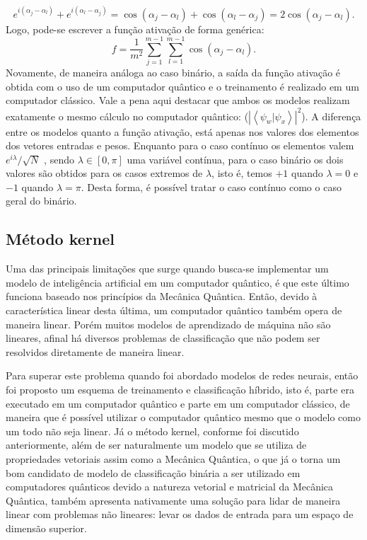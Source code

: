 \begin{equation}
e^{i\left(\alpha_{j}-\alpha_{l}\right)}+e^{i\left(\alpha_{l}-\alpha_{j}\right)}=\cos\left(\alpha_{j}-\alpha_{l}\right)+\cos\left(\alpha_{l}-\alpha_{j}\right)=2\cos\left(\alpha_{j}-\alpha_{l}\right)
. \end{equation}
Logo, pode-se escrever a função ativação de forma genérica:
\begin{equation}
f=\frac{1}{m^{2}}\sum_{j=1}^{m-1}\sum_{l=1}^{m-1}\cos\left(\alpha_{j}-\alpha_{l}\right)
. \end{equation}
Novamente, de maneira análoga ao caso binário, a saída da função ativação é obtida com o uso de um computador quântico e o treinamento é realizado em um computador clássico. Vale a pena aqui destacar que ambos os modelos realizam exatamente o mesmo cálculo no computador quântico: ($\left|\left\langle \psi_{w}|\psi_{x}\right\rangle \right|^{2}$). A diferença entre os modelos quanto a função ativação, está apenas nos valores dos elementos dos vetores entradas e pesos. Enquanto para o caso contínuo os elementos valem $e^{i\lambda}/ \sqrt{N}$ , sendo $\lambda\in\left[0,\pi\right]$ uma variável contínua, para o caso binário os dois valores são obtidos para os casos extremos de $\lambda$, isto é, temos $+1$ quando $\lambda=0$ e $-1$ quando $\lambda=\pi$. Desta forma, é possível tratar o caso contínuo como o caso geral do binário.

\subsection{Método kernel}

Uma das principais limitações que surge quando busca-se implementar um modelo de inteligência artificial em um computador quântico, é que este último funciona baseado nos princípios da Mecânica Quântica. Então, devido à característica linear desta última, um computador quântico também opera de maneira linear. Porém muitos modelos de aprendizado de máquina não são lineares, afinal há diversos problemas de classificação que não podem ser resolvidos diretamente de maneira linear.

Para superar este problema quando foi abordado modelos de redes neurais, então foi proposto um esquema de treinamento e classificação híbrido, isto é, parte era executado em um computador quântico e parte em um computador clássico, de maneira que é possível utilizar o computador quântico mesmo que o modelo como um todo não seja linear. Já o método kernel, conforme foi discutido anteriormente, além de ser  naturalmente um modelo que se utiliza de propriedades vetoriais assim como a Mecânica Quântica, o que  já  o torna  um bom candidato de modelo de classificação binária a ser utilizado em computadores quânticos devido a natureza vetorial e matricial da Mecânica Quântica,  também apresenta nativamente uma solução para lidar de maneira linear com problemas não lineares: levar os dados de entrada para um espaço de dimensão superior.

